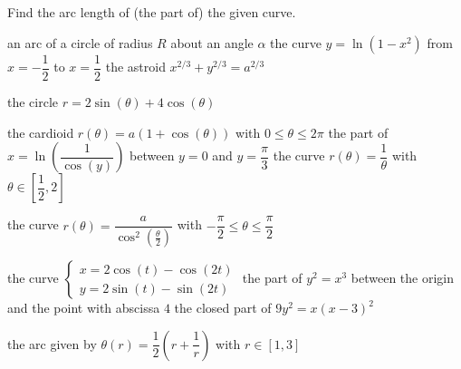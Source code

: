 \subsection*{}
\begin{Exercise} Find the arc length of (the part of) the given curve.

\ifcalculus
\Question[difficulty = 1] an arc of a circle of radius $R$ about an angle $\alpha$
\Question[difficulty = 1] the curve $y=\ln\left(1-x^2\right)$ from $x=-\dfrac{1}{2}$ to $x=\dfrac{1}{2}$
\fi
\Question[difficulty = 1] the astroid $x^{2/3} + y^{2/3} = a^{2/3} $

\ifanalysis \Question[difficulty = 1] the circle $r = 2 \sin \left( \theta \right) + 4 \cos \left( \theta \right) $
\fi

\Question[difficulty = 1] the cardioid $r(\theta) = a (1 + \cos (\theta))$ with $0 \leq \theta \leq 2\pi$ 
\ifanalysis\Question[difficulty = 1]\fi\ifcalculus\Question[difficulty = 2]\fi the part of $x = \ln \left(\dfrac{1}{\cos(y)}\right)$ between $y=0$ and $y=\dfrac{\pi}{3}$
\Question[difficulty = 2] the curve $r(\theta) = \dfrac{1}{\theta}$ with $\theta \in \left[ \dfrac{1}{2},2 \right]$ 
 
\ifanalysis
\Question[difficulty = 2] the curve $r(\theta) = \dfrac{a}{\cos^2\left(\frac{\theta}{2} \right)}$ \; with \; $-\dfrac{\pi}{2}\leq\theta\leq \dfrac{\pi}{2}$
\fi

\Question[difficulty = 2] the curve $\left\{ \begin{array}{l} x = 2 \cos(t) - \cos(2t) \\ y = 2 \sin(t) - \sin(2t)  \end{array}  \right.$
\ifanalysis\Question[difficulty = 2]\fi\ifcalculus\Question[difficulty = 3]\fi the part of $y^2 = x^3$ between the origin and the point with abscissa $4$
\ifanalysis\Question[difficulty = 2]\fi\ifcalculus\Question[difficulty = 3]\fi the closed part of $9 y^2 = x(x-3)^2$

\ifanalysis
\Question[difficulty = 3] the arc given by $\theta(r) = \dfrac{1}{2}\left( r + \dfrac{1}{r}\right)$ with $r \in [ 1,3 ]$
\fi

\end{Exercise}

